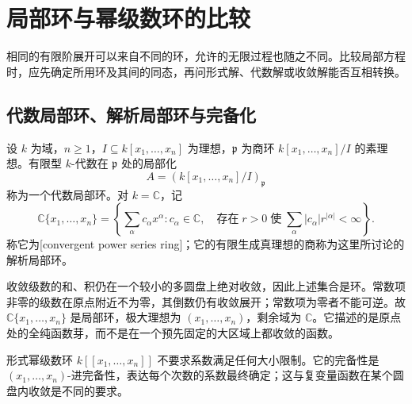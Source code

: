 
\section{局部环与幂级数环的比较}
\label{b3:sec:D01}

相同的有限阶展开可以来自不同的环，允许的无限过程也随之不同。比较局部方程时，应先确定所用环及其间的同态，再问形式解、代数解或收敛解能否互相转换。

%
%
%


\subsection{代数局部环、解析局部环与完备化}
\label{b3:subsec:D01:01}

\begin{definition}\label{b3:def:algebraic-analytic-local-model}
	设 \(k\) 为域，\(n\ge1\)，\(I\subseteq k[x_1,\ldots,x_n]\) 为理想，\(\mathfrak p\) 为商环 \(k[x_1,\ldots,x_n]/I\) 的素理想。有限型 \(k\)-代数在 \(\mathfrak p\) 处的局部化
	\[
		A=(k[x_1,\ldots,x_n]/I)_{\mathfrak p}
	\]
	称为一个代数局部环。对 \(k=\mathbb C\)，记
	\[
		\mathbb C\{x_1,\ldots,x_n\} =\left\{\sum_\alpha c_\alpha x^\alpha: c_\alpha\in\mathbb C,\quad \text{存在}\;r>0\;\text{使}\;\sum_\alpha|c_\alpha|r^{|\alpha|}<\infty\right\}.
	\]
	称它为[convergent power series ring]；它的有限生成真理想的商称为这里所讨论的解析局部环。
\end{definition}

收敛级数的和、积仍在一个较小的多圆盘上绝对收敛，因此上述集合是环。常数项非零的级数在原点附近不为零，其倒数仍有收敛展开；常数项为零者不能可逆。故 \(\mathbb C\{x_1,\ldots,x_n\}\) 是局部环，极大理想为 \((x_1,\ldots,x_n)\)，剩余域为 \(\mathbb C\)。它描述的是原点处的全纯函数芽，而不是在一个预先固定的大区域上都收敛的函数。

\ProseParagraphBreak
形式幂级数环 \(k[\![x_1,\ldots,x_n]\!]\) 不要求系数满足任何大小限制。它的完备性是 \((x_1,\ldots,x_n)\)-进完备性，表达每个次数的系数最终确定；这与复变量函数在某个圆盘内收敛是不同的要求。

